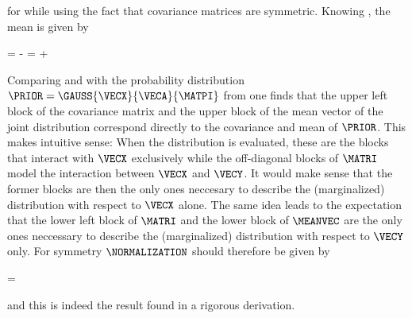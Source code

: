     for  while using the fact that covariance
    matrices are symmetric. Knowing , the mean is
    given by

    \placeformula[eq:gaussbayesjointmean]
    \startformula
        \MEANVEC = \MATRI \startpmatrix
                \MATP \VECA - \MATBT \MATQ \VECB \NR
                \MATQ \VECB \NR
            \stoppmatrix = \startpmatrix
                \VECA \NR
                \MATB \VECA + \VECB \NR
            \stoppmatrix \EQSTOP
    \stopformula

    Comparing  and  with the
    probability distribution $\PRIOR = \GAUSS{\VECX}{\VECA}{\MATPI}$ from
     one finds that the upper left block of the covariance
    matrix and the upper block of the mean vector of the joint distribution
    correspond directly to the covariance and mean of $\PRIOR$. This makes
    intuitive sense: When the distribution is evaluated, these are the blocks
    that interact with $\VECX$ exclusively while the off-diagonal blocks of
    $\MATRI$ model the interaction between $\VECX$ and $\VECY$. It would make
    sense that the former blocks are then the only ones neccesary to describe
    the (marginalized) distribution with respect to $\VECX$ alone. The same
    idea leads to the expectation that the lower left block of $\MATRI$ and the
    lower block of $\MEANVEC$ are the only ones neccessary to describe the
    (marginalized) distribution with respect to $\VECY$ only. For symmetry
    $\NORMALIZATION$ should therefore be given by
    
    \placeformula[eq:gaussbayesnorm]
    \startformula
        \NORMALIZATION = \GAUSS{\VECY}{\MATB \VECA + \VECB}{\MATQI + \MATB \MATPI \MATBT} \EQCOMMA
    \stopformula

    and this is indeed the result found in a rigorous derivation.

\stopsubsection

\stopsection


\startsection[title={Optimal Estimation},reference=ch:optimalestimation]

